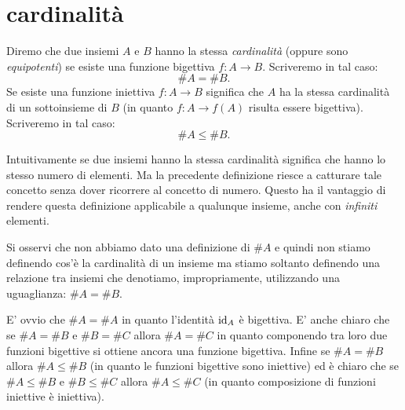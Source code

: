\section{cardinalità}
\label{sec:cardinali}

\begin{definition}[cardinalità]
  Diremo che due insiemi $A$ e $B$ hanno la stessa \emph{cardinalità}%
%
  (oppure sono \emph{equipotenti}) 
  se esiste una funzione bigettiva $f\colon A \to B$.
  Scriveremo in tal caso:
  \[
    \# A = \# B.  
  \] 
  Se esiste una funzione iniettiva $f\colon A\to B$ significa che 
  $A$ ha la stessa cardinalità di un sottoinsieme di $B$ (in quanto $f\colon A \to f(A)$
  risulta essere bigettiva). Scriveremo in tal caso:
  \[
    \# A \le \#B.
  \]
\end{definition}

Intuitivamente se due insiemi hanno la stessa cardinalità 
significa che hanno lo stesso numero di elementi.
Ma la precedente definizione riesce a catturare tale concetto senza dover 
ricorrere al concetto di numero. 
Questo ha il vantaggio di rendere questa definizione applicabile 
a qualunque insieme, anche con \emph{infiniti} elementi.

Si osservi che non abbiamo dato una definizione di $\#A$ e quindi non stiamo 
definendo cos'è la cardinalità di un insieme ma stiamo soltanto definendo 
una relazione tra insiemi che 
denotiamo, impropriamente, utilizzando una uguaglianza: $\#A = \#B$.

E' ovvio che $\#A = \#A$ in quanto l'identità $\mathrm{id}_A$ è bigettiva.
E' anche chiaro che se $\#A = \#B$ e $\#B = \#C$ allora $\#A = \#C$ in quanto 
componendo tra loro due funzioni bigettive si ottiene ancora una funzione 
bigettiva. 
Infine se $\#A = \#B$ allora $\#A \le \#B$ (in quanto le funzioni bigettive 
sono iniettive) ed è chiaro che se $\#A \le \#B$ e $\#B \le \#C$ allora 
$\#A\le \#C$ (in quanto composizione di funzioni iniettive è iniettiva).

